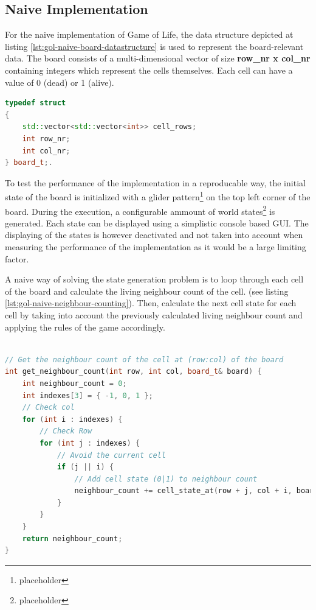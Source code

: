 \documentclass[a4paper,german,12pt,twoside=false]{scrartcl} %
\begin{document}
\subsection{Naive Implementation}

For the naive implementation of Game of Life, the data structure depicted at listing \ref{lst:gol-naive-board-datastructure} is used to represent the board-relevant data. The board consists of a multi-dimensional vector of size \textbf{row{\_}nr x col{\_}nr}  containing integers which represent the cells themselves. Each cell can have a value of 0 (dead) or 1 (alive).

\pagebreak

\begin{lstlisting}[caption={Game of Life Board Datastructure},label={lst:gol-naive-board-datastructure},language=C++]
typedef struct
{
    std::vector<std::vector<int>> cell_rows;
    int row_nr;
    int col_nr;
} board_t;.
\end{lstlisting}

To test the performance of the implementation in a reproducable way, the initial state of the board is initialized with a glider pattern\footnote{placeholder} on the top left corner of the board. During the execution, a configurable ammount of world states\footnote{placeholder} is generated. Each state can be displayed using a simplistic console based GUI. The displaying of the states is however deactivated and not taken into account when measuring the performance of the implementation as it would be a large limiting factor. \newline

A naive way of solving the state generation problem is to loop through each cell of the board and calculate the living neighbour count of the cell. (see listing \ref{lst:gol-naive-neighbour-counting}). Then, calculate the next cell state for each cell by taking into account the previously calculated living neighbour count and applying the rules of the game accordingly. 

\begin{lstlisting}[caption={Naive Neighbour Counting},label={lst:gol-naive-neighbour-counting},language=C++]

// Get the neighbour count of the cell at (row:col) of the board
int get_neighbour_count(int row, int col, board_t& board) {
    int neighbour_count = 0;
    int indexes[3] = { -1, 0, 1 };
    // Check col
    for (int i : indexes) {
        // Check Row
        for (int j : indexes) {
            // Avoid the current cell
            if (j || i) {
                // Add cell state (0|1) to neighbour count
                neighbour_count += cell_state_at(row + j, col + i, board);
            }
        }
    }
    return neighbour_count;
}

\end{lstlisting}
\end{document}
